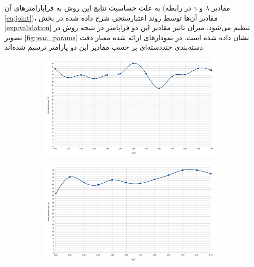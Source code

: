 به علت حساسیت نتایچ این روش به فراپارامترهای آن  (مقادیر  $\lambda$ و $\gamma$ در رابطه \eqref{eq:joint})، مقادیر آن‌ها توسط روند اعتبارسنجی شرح داده شده در بخش
\ref{exp:validation}
تنظیم می‌شود. میزان تاثیر مقادیر این دو فراپامتر در نتیجه روش در تصویر \ref{fig:jeac_params} نشان داده شده است. در نمودارهای ارائه شده معیار دقت دسته‌بندی چنددسته‌ای بر حسب مقادیر این دو پارامتر ترسیم شده‌اند.
 \begin{figure}[h]
  \centering
  \begin{subfigure}[b]{0.3\linewidth}
    \includegraphics[width=\linewidth]{images/jeac_gamma}
    \caption{}
  \end{subfigure}
%
  \begin{subfigure}[b]{0.3\linewidth}
    \includegraphics[width=\linewidth]{images/jeac_lambda}
    \caption{}
  \end{subfigure}
%
  \begin{subfigure}[b]{0.3\linewidth}

\end{subfigure}
\end{figure}
